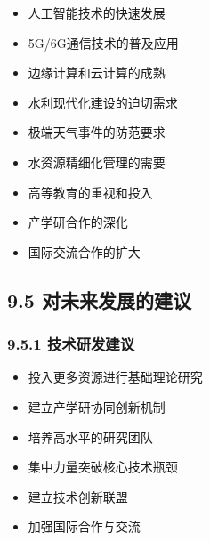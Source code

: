 
\begin{itemize}
\tightlist
\item
  人工智能技术的快速发展
\item
  5G/6G通信技术的普及应用
\item
  边缘计算和云计算的成熟
\end{itemize}


\begin{itemize}
\tightlist
\item
  水利现代化建设的迫切需求
\item
  极端天气事件的防范要求
\item
  水资源精细化管理的需要
\end{itemize}


\begin{itemize}
\tightlist
\item
  高等教育的重视和投入
\item
  产学研合作的深化
\item
  国际交流合作的扩大
\end{itemize}

\hypertarget{ux5bf9ux672aux6765ux53d1ux5c55ux7684ux5efaux8bae}{%
\subsection{9.5 对未来发展的建议}\label{ux5bf9ux672aux6765ux53d1ux5c55ux7684ux5efaux8bae}}

\hypertarget{ux6280ux672fux7814ux53d1ux5efaux8bae}{%
\subsubsection{9.5.1 技术研发建议}\label{ux6280ux672fux7814ux53d1ux5efaux8bae}}


\begin{itemize}
\tightlist
\item
  投入更多资源进行基础理论研究
\item
  建立产学研协同创新机制
\item
  培养高水平的研究团队
\end{itemize}


\begin{itemize}
\tightlist
\item
  集中力量突破核心技术瓶颈
\item
  建立技术创新联盟
\item
  加强国际合作与交流
\end{itemize}

